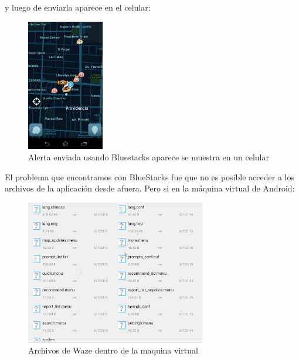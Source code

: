 y luego de enviarla aparece en el celular:

        \begin{figure}[H]
  \begin{center}
    \includegraphics[width=0.3\textwidth]{imagenes/fig37.png}
    \caption{Alerta enviada usando Bluestacks aparece se muestra en un celular}
  \end{center}
\end{figure}

El problema que encontramos con BlueStacks fue que no es posible acceder a los archivos de la aplicación desde afuera. Pero si en la máquina virtual de Android:

        \begin{figure}[H]
  \begin{center}
    \includegraphics[width=0.7\textwidth]{imagenes/fig38.png}
    \caption{Archivos de Waze dentro de la maquina virtual}
  \end{center}
\end{figure}

